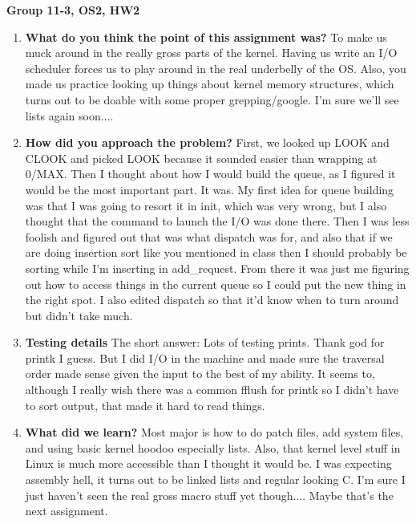 \documentclass[IEEEtran,letterpaper,10pt,notitlepage,draftclsnofoot,onecolumn]{article}
\begin{document}
\textbf{Group 11-3, OS2, HW2}

\begin{enumerate}
\item 
\textbf{What do you think the point of this assignment was?}
To make us muck around in the really gross parts of the kernel. 
Having us write an I/O scheduler forces us to play around
in the real underbelly of the OS. Also, you made us practice
looking up things about kernel memory structures, which turns
out to be doable with some proper grepping/google. I'm sure
we'll see lists again soon....

\item 
\textbf{How did you approach the problem?}
First, we looked up LOOK and CLOOK and picked LOOK because
it sounded easier than wrapping at 0/MAX. Then I thought
about how I would build the queue, as I figured it would
be the most important part. It was. My first idea for 
queue building was that I was going to resort it in
init, which was very wrong, but I also thought that
the command to launch the I/O was done there. Then I 
was less foolish and figured out that was what dispatch 
was for, and also that if we are doing insertion sort like
you mentioned in class then I should probably be sorting
while I'm inserting in add\_request. From there it was just
me figuring out how to access things in the current queue
so I could put the new thing in the right spot.
I also edited dispatch so that it'd know when to turn around
but didn't take much.

\item
\textbf{Testing details}
The short answer: Lots of testing prints. Thank god for
printk I guess. But I did I/O in the machine and made sure
the traversal order made sense given the input to the best
of my ability. It seems to, although I really wish there
was a common fflush for printk so I didn't have to sort 
output, that made it hard to read things.
\item
\textbf{What did we learn?}
Most major is how to do patch files, add system files,
and using basic kernel hoodoo especially lists.
Also, that kernel level stuff in Linux is much more
accessible than I thought it would be. I was expecting
assembly hell, it turns out to be linked lists and regular
looking C. I'm sure I just haven't seen the real gross
macro stuff yet though....
Maybe that's the next assignment.
\end{enumerate}
\end{document}
